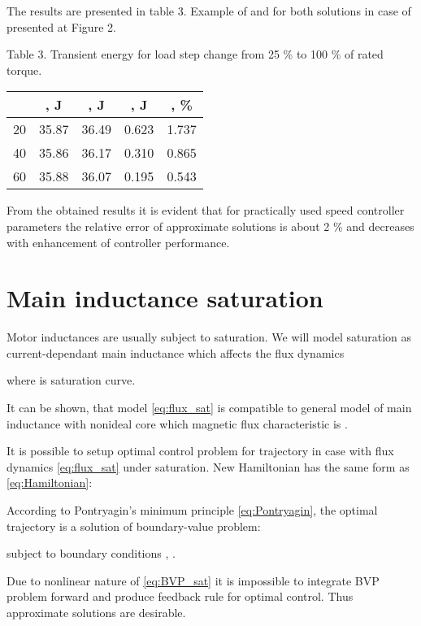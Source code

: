 \documentclass[journal]{IEEEtran}
\begin{document}
The results are presented in table 3. Example of  and  for both solutions in case of  presented at Figure 2.

\begin{center}
Table 3.
Transient energy for load step change from 25 \% to 100 \% of rated torque.

\begin{tabular}{ | c | c | c | c | c | }
\hline 
   & , J & , J & , J & , \% \\
\hline 
20 &  35.87 &  36.49  &  0.623  &  1.737 \\
40 &  35.86 &  36.17  &  0.310  &  0.865 \\
60 &  35.88 &  36.07  &  0.195  &  0.543 \\
\hline 
\end{tabular}

\end{center}

From the obtained results it is evident that for practically used speed controller parameters the relative error of approximate solutions is about 2 \% and decreases with enhancement of controller performance.

\section{Main inductance saturation}

Motor inductances are usually subject to saturation. We will model saturation as current-dependant main inductance which affects the flux dynamics



where  is saturation curve. 

It can be shown, that model \eqref{eq:flux_sat} is compatible to general model of main inductance with nonideal core \cite{10} which magnetic flux characteristic is .

It is possible to setup optimal control problem for trajectory  in case with flux dynamics \eqref{eq:flux_sat} under saturation.
New Hamiltonian has the same form as \eqref{eq:Hamiltonian}:



According to Pontryagin's minimum principle \eqref{eq:Pontryagin}, the optimal trajectory  is a solution of boundary-value problem:



subject to boundary conditions , . 

Due to nonlinear nature of \eqref{eq:BVP_sat} it is impossible to integrate BVP problem forward and produce feedback rule for optimal control. Thus approximate solutions are desirable.
\end{document}
